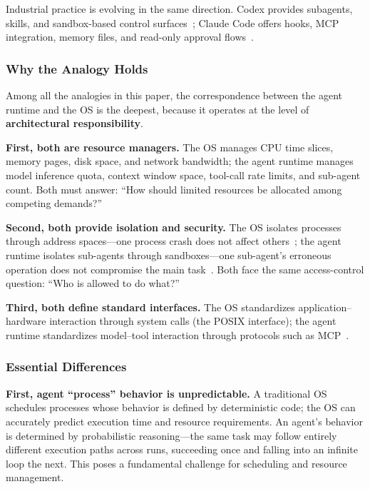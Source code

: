 \documentclass[11pt,a4paper]{article}
\begin{document}
Industrial practice is evolving in the same direction.
Codex provides subagents, skills, and sandbox-based control surfaces~\cite{openai_codex_overview_2026}; Claude Code offers hooks, MCP integration, memory files, and read-only approval flows~\cite{anthropic_claudecode_overview_2026}.

\subsubsection{Why the Analogy Holds}

Among all the analogies in this paper, the correspondence between the agent runtime and the OS is the deepest, because it operates at the level of \textbf{architectural responsibility}.

\textbf{First, both are resource managers.}
The OS manages CPU time slices, memory pages, disk space, and network bandwidth; the agent runtime manages model inference quota, context window space, tool-call rate limits, and sub-agent count.
Both must answer: ``How should limited resources be allocated among competing demands?''

\textbf{Second, both provide isolation and security.}
The OS isolates processes through address spaces---one process crash does not affect others~\cite{ostep_2023}; the agent runtime isolates sub-agents through sandboxes---one sub-agent's erroneous operation does not compromise the main task~\cite{openai_codex_sandbox_2026,anthropic_claudecode_sandbox_2026}.
Both face the same access-control question: ``Who is allowed to do what?''

\textbf{Third, both define standard interfaces.}
The OS standardizes application--hardware interaction through system calls (the POSIX interface); the agent runtime standardizes model--tool interaction through protocols such as MCP~\cite{mcp_intro_2026}.

\subsubsection{Essential Differences}

\textbf{First, agent ``process'' behavior is unpredictable.}
A traditional OS schedules processes whose behavior is defined by deterministic code; the OS can accurately predict execution time and resource requirements.
An agent's behavior is determined by probabilistic reasoning---the same task may follow entirely different execution paths across runs, succeeding once and falling into an infinite loop the next.
This poses a fundamental challenge for scheduling and resource management.
\end{document}
